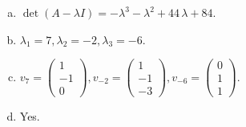 \begin{questions}
\begin{solution}
\begin{enumerate}[(a)]
\item $\det(A-\lambda I)=-{\lambda}^{3} - {\lambda}^{2} + 44 \, {\lambda} + 84$.
\item ${\lambda}_1=7, {\lambda}_2=-2, {\lambda}_3=-6$.
\item $v_{7}=\left(\begin{array}{r}
1 \\
-1 \\
0
\end{array}\right), v_{-2}=\left(\begin{array}{r}
1 \\
-1 \\
-3
\end{array}\right), v_{-6}=\left(\begin{array}{r}
0 \\
1 \\
1
\end{array}\right)$.
\item Yes.
\end{enumerate}
\end{solution}

\end{questions}

\newpage


\begin{center}
\end{center}


